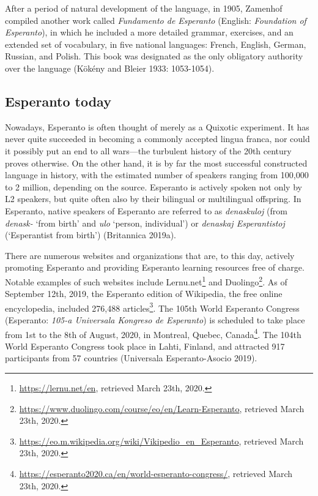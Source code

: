 After a period of natural development of the language, in 1905, Zamenhof compiled another work called \textit{Fundamento de Esperanto} (English: \textit{Foundation of Esperanto}), in which he included a more detailed grammar, exercises, and an extended set of vocabulary, in five national languages: French, English, German, Russian, and Polish.
This book was designated as the only obligatory authority over the language
(Kökény and Bleier 1933: 1053-1054).

\subsection{Esperanto today}
Nowadays, Esperanto is often thought of merely as a Quixotic experiment.
It has never quite succeeded in becoming a commonly accepted lingua franca, nor could it possibly put an end to all wars---the turbulent history of the 20th century proves otherwise.
On the other hand, it is by far the most successful constructed language in history, with the estimated number of speakers ranging from 100,000 to 2 million, depending on the source.
Esperanto is actively spoken not only by L2 speakers, but quite often also by their bilingual or multilingual offspring.
In Esperanto, native speakers of Esperanto are referred to as \textit{denaskuloj} (from \textit{denask-} `from birth' and \textit{ulo} `person, individual') or \textit{denaskaj Esperantistoj} (`Esperantist from birth')
(Britannica 2019a).

There are numerous websites and organizations that are, to this day, actively promoting Esperanto and providing Esperanto learning resources free of charge.
Notable examples of such websites include Lernu.net\footnote{\url{https://lernu.net/en}, retrieved March 23th, 2020.} and Duolingo\footnote{\url{https://www.duolingo.com/course/eo/en/Learn-Esperanto}, retrieved March 23th, 2020.}.
As of September 12th, 2019, the Esperanto edition of Wikipedia, the free online encyclopedia, included 276,488 articles\footnote{\url{https://eo.m.wikipedia.org/wiki/Vikipedio_en_Esperanto}, retrieved March 23th, 2020.}.
The 105th World Esperanto Congress (Esperanto: \textit{105-a Universala Kongreso de Esperanto}) is scheduled to take place from 1st to the 8th of August, 2020, in Montreal, Quebec, Canada\footnote{\url{https://esperanto2020.ca/en/world-esperanto-congress/}, retrieved March 23th, 2020.}.
The 104th World Esperanto Congress took place in Lahti, Finland, and attracted 917 participants from 57 countries (Universala Esperanto-Asocio 2019).

